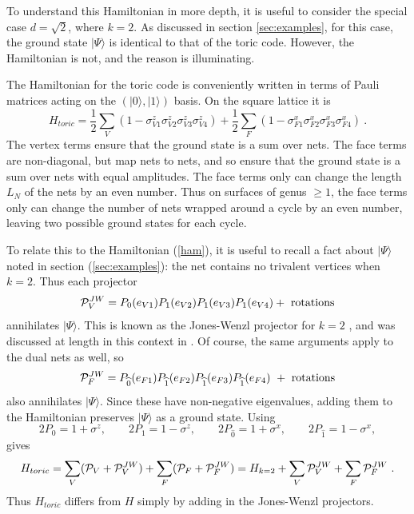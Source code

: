 \documentclass[11pt]{article}
\begin{document}
To understand this Hamiltonian in more depth, it is useful to consider
the special case $d=\sqrt{2}$, where $k=2$. 
As discussed in section \ref{sec:examples}, for this case, the
ground state $|\Psi\rangle$ is identical to that of the toric
code. However, the Hamiltonian is not, and the reason is illuminating.

The Hamiltonian for the toric code is conveniently written in terms of
Pauli matrices acting on the $(|0\rangle,|1\rangle)$ basis. On the
square lattice it is
$$H_{toric} = \frac{1}{2}\sum_V
(1-\sigma^z_{V1}\sigma^z_{V2}\sigma^z_{V3}\sigma^z_{V4})
+ \frac{1}{2}\sum_F(1-\sigma^x_{F1}\sigma^x_{F2}\sigma^x_{F3}\sigma^x_{F4})\ .
$$ The vertex terms ensure that the ground state is a sum over
nets. The face terms are non-diagonal, but map nets to nets, and so
ensure that the ground state is a sum over nets with equal
amplitudes. The face terms only can change the length $L_N$ of the
nets by an even number. Thus on surfaces of genus $\ge 1$, the face terms
only can change the number of nets wrapped around a cycle by an even
number, leaving two possible ground states for each cycle.

To relate this to the Hamiltonian (\ref{ham}), it is useful to recall
a fact about $|\Psi\rangle$ noted in section (\ref{sec:examples}): the net
contains no trivalent vertices when $k=2$. Thus each projector
\begin{equation}
{\cal P}_V^{JW} =
P_{0}(e_{V1}) 
P_{1}(e_{V2}) P_{1}(e_{V3})P_{1}(e_{V4})
 + \hbox{ rotations}
\label{HJW}
\end{equation}
 annihilates $|\Psi\rangle$. This is known as the Jones-Wenzl
projector for $k=2$ \cite{Jones,JW}, and was discussed at length in
this context in \cite{FKrush}. Of course, the same arguments apply to
the dual nets as well, so
\begin{equation}
{\cal P}_{F}^{JW} = P_{\widehat{0}}(e_{F1}) 
P_{\widehat{1}}(e_{F2}) P_{\widehat{1}}(e_{F3})P_{\widehat{1}}(e_{F4})\
 + \hbox{ rotations}
\end{equation}
also annihilates $|\Psi\rangle$.
Since these have non-negative eigenvalues, adding them to the
Hamiltonian preserves $|\Psi\rangle$ as a ground state. Using
$$2P_0 = 1+\sigma^z, \qquad 2P_1 = 1-\sigma^z, \qquad 2P_{\widehat{0}}
= 1+\sigma^x,\qquad 2P_{\widehat{1}}=1-\sigma^x, $$
gives
\begin{equation}
H_{toric} = 
\sum_V ({\cal P}_V + {\cal P}_V^{JW}) +
\sum_F ({\cal P}_F + {\cal P}_F^{JW})
= H_{k=2} + \sum_V  {\cal P}_V^{JW} +
\sum_F {\cal P}_F^{JW}\ .
\label{toricH}
\end{equation}
Thus $H_{toric}$ differs from $H$ simply by adding in the
Jones-Wenzl projectors. 
\end{document}
